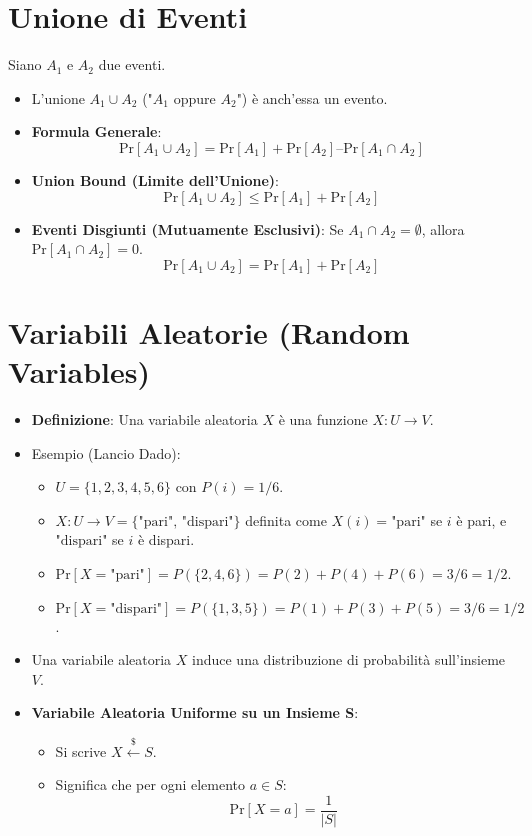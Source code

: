\section{Unione di Eventi}
Siano $A_1$ e $A_2$ due eventi.
\begin{itemize}
    \item L'unione $A_1 \cup A_2$ ("$A_1$ oppure $A_2$") è anch'essa un evento.
    \item \textbf{Formula Generale}:
    \[ \text{Pr}[A_1 \cup A_2] = \text{Pr}[A_1] + \text{Pr}[A_2] – \text{Pr}[A_1 \cap A_2] \]
    \item \textbf{Union Bound (Limite dell'Unione)}:
    \[ \text{Pr}[A_1 \cup A_2] \le \text{Pr}[A_1] + \text{Pr}[A_2] \]
    \item \textbf{Eventi Disgiunti (Mutuamente Esclusivi)}: Se $A_1 \cap A_2 = \emptyset$, allora $\text{Pr}[A_1 \cap A_2] = 0$.
    \[ \text{Pr}[A_1 \cup A_2] = \text{Pr}[A_1] + \text{Pr}[A_2] \]
\end{itemize}

\section{Variabili Aleatorie (Random Variables)}
\begin{itemize}
    \item \textbf{Definizione}: Una variabile aleatoria $X$ è una funzione $X : U \to V$.
    \item Esempio (Lancio Dado):
    \begin{itemize}
        \item $U = \{1, 2, 3, 4, 5, 6\}$ con $P(i) = 1/6$.
        \item $X: U \to V=\{\text{"pari", "dispari"}\}$ definita come $X(i) = \text{"pari"}$ se $i$ è pari, e $\text{"dispari"}$ se $i$ è dispari.
        \item $\text{Pr}[X=\text{"pari"}] = P(\{2, 4, 6\}) = P(2)+P(4)+P(6) = 3/6 = 1/2$.
        \item $\text{Pr}[X=\text{"dispari"}] = P(\{1, 3, 5\}) = P(1)+P(3)+P(5) = 3/6 = 1/2$.
    \end{itemize}
    \item Una variabile aleatoria $X$ induce una distribuzione di probabilità sull'insieme $V$.
    \item \textbf{Variabile Aleatoria Uniforme su un Insieme S}:
    \begin{itemize}
        \item Si scrive $X \stackrel{\$}{\leftarrow} S$.
        \item Significa che per ogni elemento $a \in S$:
        \[ \text{Pr}[X=a] = \frac{1}{|S|} \]
    \end{itemize}
\end{itemize}

